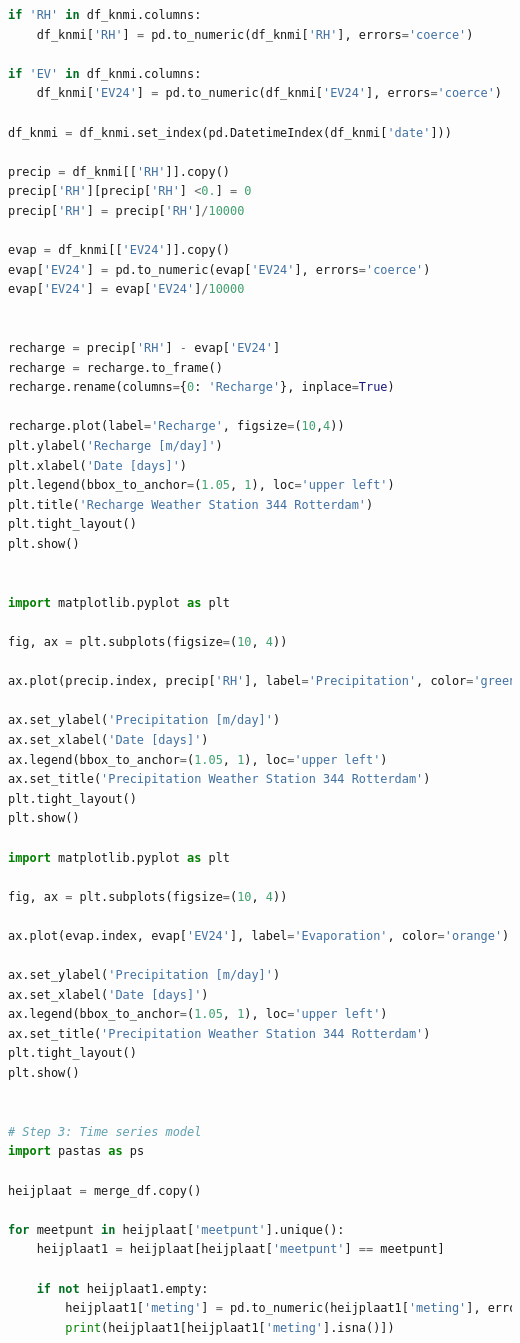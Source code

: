 \begin{lstlisting}[language=Python]
if 'RH' in df_knmi.columns:
    df_knmi['RH'] = pd.to_numeric(df_knmi['RH'], errors='coerce')

if 'EV' in df_knmi.columns:
    df_knmi['EV24'] = pd.to_numeric(df_knmi['EV24'], errors='coerce')

df_knmi = df_knmi.set_index(pd.DatetimeIndex(df_knmi['date']))

precip = df_knmi[['RH']].copy()
precip['RH'][precip['RH'] <0.] = 0 
precip['RH'] = precip['RH']/10000 

evap = df_knmi[['EV24']].copy()
evap['EV24'] = pd.to_numeric(evap['EV24'], errors='coerce')
evap['EV24'] = evap['EV24']/10000


recharge = precip['RH'] - evap['EV24']
recharge = recharge.to_frame()
recharge.rename(columns={0: 'Recharge'}, inplace=True)

recharge.plot(label='Recharge', figsize=(10,4))
plt.ylabel('Recharge [m/day]')
plt.xlabel('Date [days]')
plt.legend(bbox_to_anchor=(1.05, 1), loc='upper left')
plt.title('Recharge Weather Station 344 Rotterdam')
plt.tight_layout()
plt.show()


import matplotlib.pyplot as plt

fig, ax = plt.subplots(figsize=(10, 4))

ax.plot(precip.index, precip['RH'], label='Precipitation', color='green')

ax.set_ylabel('Precipitation [m/day]')
ax.set_xlabel('Date [days]')
ax.legend(bbox_to_anchor=(1.05, 1), loc='upper left')
ax.set_title('Precipitation Weather Station 344 Rotterdam')
plt.tight_layout()
plt.show()

import matplotlib.pyplot as plt

fig, ax = plt.subplots(figsize=(10, 4))

ax.plot(evap.index, evap['EV24'], label='Evaporation', color='orange')

ax.set_ylabel('Precipitation [m/day]')
ax.set_xlabel('Date [days]')
ax.legend(bbox_to_anchor=(1.05, 1), loc='upper left')
ax.set_title('Precipitation Weather Station 344 Rotterdam')
plt.tight_layout()
plt.show()


# Step 3: Time series model 
import pastas as ps 

heijplaat = merge_df.copy()

for meetpunt in heijplaat['meetpunt'].unique():
    heijplaat1 = heijplaat[heijplaat['meetpunt'] == meetpunt]
    
    if not heijplaat1.empty:
        heijplaat1['meting'] = pd.to_numeric(heijplaat1['meting'], errors='coerce').fillna(method='bfill')
        print(heijplaat1[heijplaat1['meting'].isna()])
        

\end{lstlisting}
